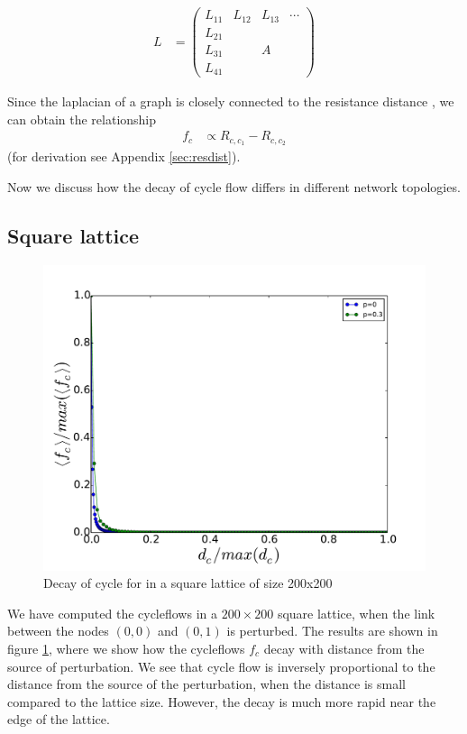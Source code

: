 \documentclass[10pt,aps,pra,twocolumn,superscriptaddress]{revtex4-1}
\begin{document}
\begin{align*}
L&=
\left(
\begin{array}{c|ccc}
L_{11} & L_{12} & L_{13} & \cdots \\
\hline
L_{21} &&&\\
L_{31} && A &\\
L_{41} &&&         
\end{array}
\right)
\end{align*}

Since the laplacian of a graph is closely connected to the resistance distance 
\cite{klein93}, we can obtain the relationship
\begin{align}
\label{eq:fc-resdist}
f_c&\propto R_{c,c_1}-R_{c,c_2}
\end{align}
(for derivation see Appendix \ref{sec:resdist}).

Now we discuss how the decay of cycle flow differs in different network 
topologies.  

\subsection{Square lattice}

\begin{figure}
    \includegraphics[width=.9\columnwidth]{pics/decay_sqgrid}
    \caption{Decay of cycle for in a square lattice of size 200x200}
    \label{fig-decay-sqlat}
\end{figure}

We have computed the cycleflows in a $200\times 200$ square lattice, when the 
link between the nodes $(0,0)$ and $(0,1)$ is perturbed.  The results are 
shown in figure \ref{fig-decay-sqlat}, where we show how the cycleflows $f_c$ decay with 
distance from the source of perturbation.  We see that cycle flow is inversely proportional to the distance from the 
source of the perturbation, when the distance is small compared to the lattice 
size.   However, the decay is much more rapid near the edge of the lattice.    
\end{document}
